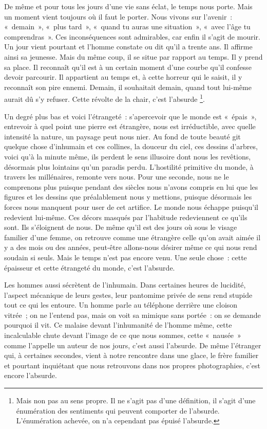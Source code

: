\documentclass{book}
\begin{document}
De même et pour tous les jours d'une vie sans éclat, le temps nous porte. Mais un moment vient toujours où il faut le porter. Nous vivons sur l'avenir : « demain », « plus tard », « quand tu auras une situation », « avec l'âge tu comprendras ». Ces inconséquences sont admirables, car enfin il s'agit de mourir. Un jour vient pourtant et l'homme constate ou dit qu'il a trente ans. Il affirme ainsi sa jeunesse. Mais du même coup, il se situe par rapport au temps. Il y prend sa place. Il reconnaît qu'il est à un certain moment d'une courbe qu'il confesse devoir parcourir. Il appartient au temps et, à cette horreur qui le saisit, il y reconnaît son pire ennemi. Demain, il souhaitait demain, quand tout lui-même aurait dû s'y refuser. Cette révolte de la chair, c'est l'absurde \footnote{Mais non pas au sens propre. Il ne s'agit pas d'une définition, il s'agit d'une énumération des sentiments qui peuvent comporter de l'absurde. L'énumération achevée, on n'a cependant pas épuisé l'absurde.}.

Un degré plus bas et voici l'étrangeté : s'apercevoir que le monde est « épais », entrevoir à quel point une pierre est étrangère, nous est irréductible, avec quelle intensité la nature, un paysage peut nous nier. Au fond de toute beauté git quelque chose d'inhumain et ces collines, la douceur du ciel, ces dessins d'arbres, voici qu'à la minute même, ils perdent le sens illusoire dont nous les revêtions, désormais plus lointains qu'un paradis perdu. L'hostilité primitive du monde, à travers les millénaires, remonte vers nous. Pour une seconde, nous ne le comprenons plus puisque pendant des siècles nous n'avons compris en lui que les figures et les dessins que préalablement nous y mettions, puisque désormais les forces nous manquent pour user de cet artifice. Le monde nous échappe puisqu'il redevient lui‑même. Ces décors masqués par l'habitude redeviennent ce qu'ils sont. Ils s'éloignent de nous. De même qu'il est des jours où sous le visage familier d'une femme, on retrouve comme une étrangère celle qu'on avait aimée il y a des mois ou des années, peut-être allons-nous désirer même ce qui nous rend soudain si seuls. Mais le temps n'est pas encore venu. Une seule chose : cette épaisseur et cette étrangeté du monde, c'est l'absurde.

Les hommes aussi sécrètent de l'inhumain. Dans certaines heures de lucidité, l'aspect mécanique de leurs gestes, leur pantomime privée de sens rend stupide tout ce qui les entoure. Un homme parle au téléphone derrière une cloison vitrée ; on ne l'entend pas, mais on voit sa mimique sans portée : on se demande pourquoi il vit. Ce malaise devant l'inhumanité de l'homme même, cette incalculable chute devant l'image de ce que nous sommes, cette « nausée » comme l'appelle un auteur de nos jours, c'est aussi l'absurde. De même l'étranger qui, à certaines secondes, vient à notre rencontre dans une glace, le frère familier et pourtant inquiétant que nous retrouvons dans nos propres photographies, c'est encore l'absurde.
\end{document}
